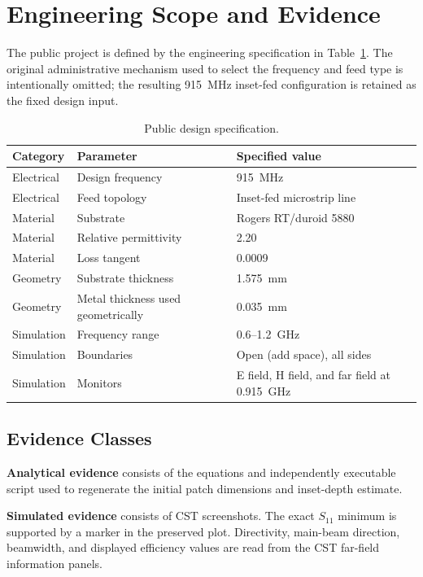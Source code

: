 \section{Engineering Scope and Evidence}
\label{sec:scope-and-evidence}

The public project is defined by the engineering specification in
Table~\ref{tab:design-specification}. The original administrative mechanism used to
select the frequency and feed type is intentionally omitted; the resulting 915~MHz
inset-fed configuration is retained as the fixed design input.

\begin{table}[H]
\centering
\caption{Public design specification.}
\label{tab:design-specification}
\begin{tabularx}{\textwidth}{@{}p{}p{}X@{}}
\toprule
\textbf{Category} & \textbf{Parameter} & \textbf{Specified value} \\
\midrule
Electrical & Design frequency & 915~MHz \\
Electrical & Feed topology & Inset-fed microstrip line \\
Material & Substrate & Rogers RT/duroid 5880 \\
Material & Relative permittivity & 2.20 \\
Material & Loss tangent & 0.0009 \\
Geometry & Substrate thickness & 1.575~mm \\
Geometry & Metal thickness used geometrically & 0.035~mm \\
Simulation & Frequency range & 0.6--1.2~GHz \\
Simulation & Boundaries & Open (add space), all sides \\
Simulation & Monitors & E field, H field, and far field at 0.915~GHz \\
\bottomrule
\end{tabularx}
\end{table}

\subsection{Evidence Classes}

\textbf{Analytical evidence} consists of the equations and independently executable
script used to regenerate the initial patch dimensions and inset-depth estimate.

\textbf{Simulated evidence} consists of CST screenshots. The exact $S_{11}$ minimum is
supported by a marker in the preserved plot. Directivity, main-beam direction,
beamwidth, and displayed efficiency values are read from the CST far-field information
panels.

